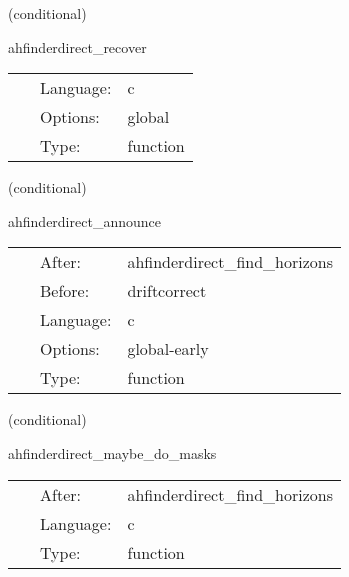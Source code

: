 \vspace{5mm}

   (conditional) 

\hspace{5mm} ahfinderdirect\_recover 

\hspace{5mm}{\it import horizon data from cactus variables } 


\hspace{5mm}

 \begin{tabular*}{160mm}{cll} 
~ & Language:  & c \\ 
~ & Options:  & global \\ 
~ & Type:  & function \\ 
\end{tabular*} 


\vspace{5mm}

   (conditional) 

\hspace{5mm} ahfinderdirect\_announce 

\hspace{5mm}{\it announce horizon position(s) to other thorns } 


\hspace{5mm}

 \begin{tabular*}{160mm}{cll} 
~ & After:  & ahfinderdirect\_find\_horizons \\ 
~ & Before:  & driftcorrect \\ 
~ & Language:  & c \\ 
~ & Options:  & global-early \\ 
~ & Type:  & function \\ 
\end{tabular*} 


\vspace{5mm}

   (conditional) 

\hspace{5mm} ahfinderdirect\_maybe\_do\_masks 

\hspace{5mm}{\it set mask(s) based on apparent horizon position(s) } 


\hspace{5mm}

 \begin{tabular*}{160mm}{cll} 
~ & After:  & ahfinderdirect\_find\_horizons \\ 
~ & Language:  & c \\ 
~ & Type:  & function \\ 
\end{tabular*} 


